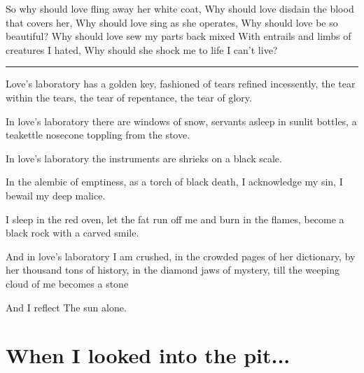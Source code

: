 \documentclass[english,11pt,letterpaper,onecolumn,parskip=full]{scrbook}
\begin{document}
\begin{poem}
\begin{stanza}
So why should love fling away her white coat,\verseline
Why should love disdain the blood that covers her,\verseline
Why should love sing as she operates,\verseline
Why should love be so beautiful?\verseline
Why should love sew my parts back mixed\verseline
With entrails and limbs of creatures I hated,\verseline
Why should she shock me to life I can't live?
\end{stanza}

\begin{center}\rule[3pt]{2in}{0.5pt}\end{center}

\begin{stanza}
Love's laboratory has a golden key, fashioned of tears refined incessently, the tear within the tears, the tear of repentance, the tear of glory.
\end{stanza}

\begin{stanza}
In love's laboratory there are windows of snow, servants asleep in sunlit bottles, a teakettle nosecone toppling from the stove.
\end{stanza}

\begin{stanza}
In love's laboratory the instruments are shrieks on a black scale.
\end{stanza}

\begin{stanza}
In the alembic of emptiness, as a torch of black death, I acknowledge my sin, I bewail my deep malice.
\end{stanza}

\begin{stanza}
I sleep in the red oven, let the fat run off me and burn in the flames, become a black rock with a carved smile.
\end{stanza}

\begin{stanza}
And in love's laboratory I am crushed, in the crowded pages of her dictionary, by her thousand tons of history, in the diamond jaws of mystery, till the weeping cloud of me becomes a stone
\end{stanza}

\begin{stanza}
And I reflect\verseline
The sun alone.
\end{stanza}
\attribution{}
\end{poem}

\section{When I looked into the pit...}
\end{document}
